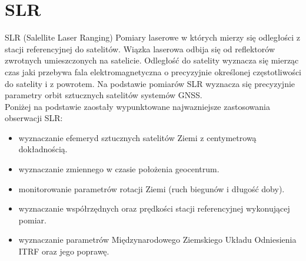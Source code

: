 \section{SLR}
\noindent SLR (Salellite Laser Ranging)
Pomiary laserowe w których mierzy się odległości 
z stacji referencyjnej do satelitów. Wiązka laserowa odbija się od reflektorów zwrotnych umieszczonych 
na satelicie. Odległość do satelity wyznacza się mierząc czas jaki przebywa fala elektromagnetyczna o 
precyzyjnie określonej częstotliwości do satelity i z powrotem. Na podstawie pomiarów SLR wyznacza się precyzyjnie 
parametry orbit sztucznych satelitów systemów GNSS.\\
\indent Poniżej na podstawie \cite[][zakładka: Stacja Laserowa/informacje ogólne]{BOROWIEC} zaostały wypunktowane najwazniejsze zastosowania obserwacji SLR:
\begin{itemize}
\item wyznaczanie efemeryd sztucznych satelitów Ziemi z centymetrową dokładnością.
\item wyznaczanie zmiennego w czasie położenia geocentrum.
\item monitorowanie parametrów rotacji Ziemi (ruch biegunów i długość doby).
\item wyznaczanie współrzędnych oraz prędkości stacji referencyjnej wykonującej pomiar.
\item wyznaczanie parametrów Międzynarodowego Ziemskiego Układu Odniesienia ITRF oraz jego poprawę.
\end{itemize}
